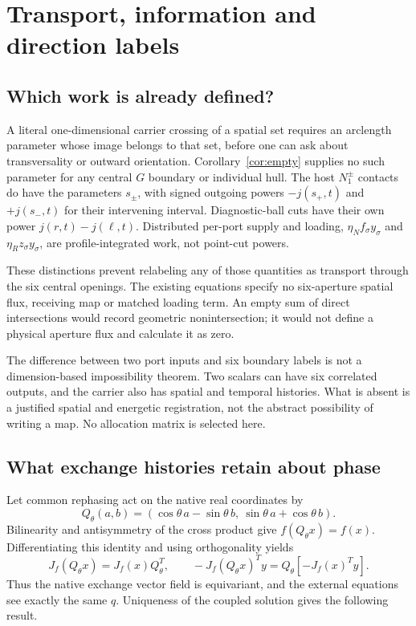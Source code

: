 \section{Transport, information and direction labels}\label{sec:transport}
\subsection{Which work is already defined?}\label{sec:Gtransport}
A literal one-dimensional carrier crossing of a spatial set requires an arclength parameter whose image belongs to that set, before one can ask about transversality or outward orientation. Corollary~\ref{cor:empty} supplies no such parameter for any central $G$ boundary or individual hull. The host $N_1^\pm$ contacts do have the parameters $s_\pm$, with signed outgoing powers $-j(s_+,t)$ and $+j(s_-,t)$ for their intervening interval. Diagnostic-ball cuts have their own power $j(r,t)-j(\ell,t)$. Distributed per-port supply and loading, $\eta_Nf_\sigma y_\sigma$ and $\eta_Rz_\sigma y_\sigma$, are profile-integrated work, not point-cut powers.

These distinctions prevent relabeling any of those quantities as transport through the six central openings. The existing equations specify no six-aperture spatial flux, receiving map or matched loading term. An empty sum of direct intersections would record geometric nonintersection; it would not define a physical aperture flux and calculate it as zero.

The difference between two port inputs and six boundary labels is not a dimension-based impossibility theorem. Two scalars can have six correlated outputs, and the carrier also has spatial and temporal histories. What is absent is a justified spatial and energetic registration, not the abstract possibility of writing a map. No allocation matrix is selected here.

\subsection{What exchange histories retain about phase}\label{sec:phase}
Let common rephasing act on the native real coordinates by
\begin{equation}\label{eq:Q}
 Q_\theta(a,b)=(\cos\theta\,a-\sin\theta\,b,\ \sin\theta\,a+\cos\theta\,b).
\end{equation}
Bilinearity and antisymmetry of the cross product give $f(Q_\theta x)=f(x)$. Differentiating this identity and using orthogonality yields
\begin{equation}\label{eq:equivariance}
 J_f(Q_\theta x)=J_f(x)Q_\theta^T,\qquad
 -J_f(Q_\theta x)^Ty=Q_\theta[-J_f(x)^Ty].
\end{equation}
Thus the native exchange vector field is equivariant, and the external equations see exactly the same $q$. Uniqueness of the coupled solution gives the following result.

